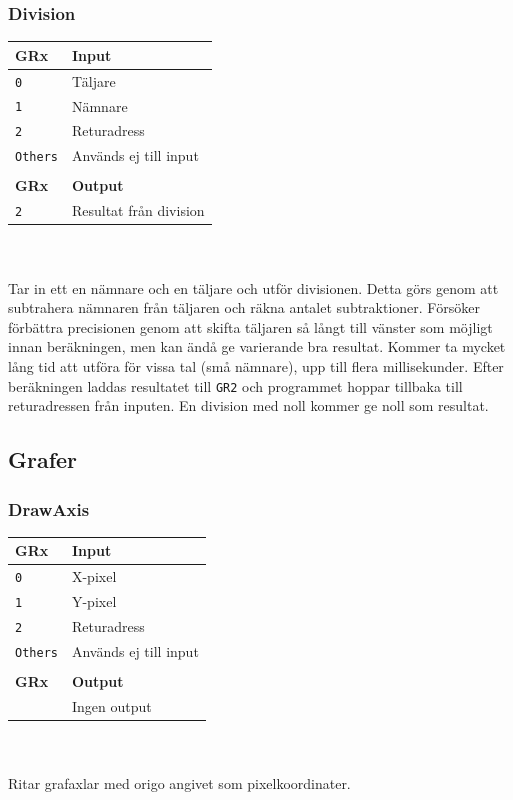 \documentclass[]{article}
\begin{document}
\subsubsection{Division}
\begin{tabular}{ll}
	\textbf{GRx}    & \textbf{Input}         \\ \hline
	\texttt{0}      & Täljare                \\
	\texttt{1}      & Nämnare                \\
	\texttt{2}      & Returadress            \\
	\texttt{Others} & Används ej till input  \\
	                &  \\
	\textbf{GRx}    & \textbf{Output}        \\ \hline
	\texttt{2}      & Resultat från division
\end{tabular}
\\\\
\noindent
Tar in ett en nämnare och en täljare och utför divisionen. Detta görs genom att subtrahera nämnaren från täljaren och räkna antalet subtraktioner. Försöker förbättra precisionen genom att skifta täljaren så långt till vänster som möjligt innan beräkningen, men kan ändå ge varierande bra resultat. Kommer ta mycket lång tid att utföra för vissa tal (små nämnare), upp till flera millisekunder. Efter beräkningen laddas resultatet till \texttt{GR2} och programmet hoppar tillbaka till returadressen från inputen. En division med noll kommer ge noll som resultat.

\subsection{Grafer}

\subsubsection{DrawAxis}
\label{sec:drawaxis}

\begin{tabular}{ll}
	\textbf{GRx}    & \textbf{Input}        \\ \hline
	\texttt{0}      & X-pixel               \\
	\texttt{1}      & Y-pixel               \\
	\texttt{2}      & Returadress           \\
	\texttt{Others} & Används ej till input \\
	             &  \\
	\textbf{GRx} & \textbf{Output}              \\ \hline
	             & Ingen output
\end{tabular}
\\\\
\noindent
Ritar grafaxlar med origo angivet som pixelkoordinater.
\end{document}
